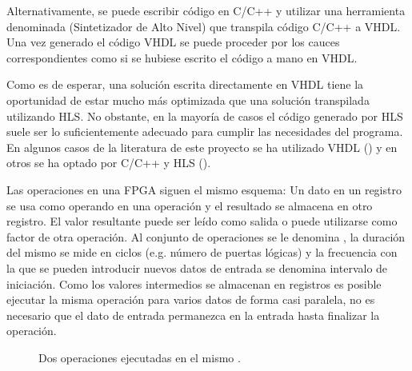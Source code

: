 Alternativamente, se puede escribir código en C/C++ y utilizar una herramienta denominada
 (Sintetizador de Alto Nivel) que
transpila código C/C++ a VHDL.
Una vez generado el código VHDL se puede proceder por los cauces
correspondientes como si se hubiese escrito el código a mano en VHDL.

Como es de esperar, una solución escrita directamente en VHDL
tiene la oportunidad de estar mucho más optimizada que una solución transpilada utilizando HLS.
No obstante, en la mayoría de casos el código generado por HLS
suele ser lo suficientemente adecuado para cumplir las necesidades del programa.
En algunos casos de la literatura de este proyecto se ha utilizado
VHDL (\cite{ZJW20}) y en otros se ha optado por C/C++ y HLS (\cite{NSG17}).

Las operaciones en una FPGA siguen el mismo esquema: Un dato en un registro
se usa como operando en una operación y el resultado se almacena en otro registro.
El valor resultante puede ser leído como salida o puede utilizarse como
factor de otra operación.
Al conjunto de operaciones se le denomina ,
la duración del mismo se mide en ciclos (e.g. número de puertas lógicas)
y la frecuencia con la que se pueden introducir nuevos datos de entrada
se denomina intervalo de iniciación.
Como los valores intermedios se almacenan en registros
es posible ejecutar la misma operación para varios datos
de forma casi paralela,
no es necesario que el dato de entrada permanezca en la entrada hasta finalizar
la operación.

\begin{figure}[h]
    \begin{center}
    \end{center}
    \caption{Dos operaciones ejecutadas en el mismo .}
    \label{fig:Pipeline}
\end{figure}

